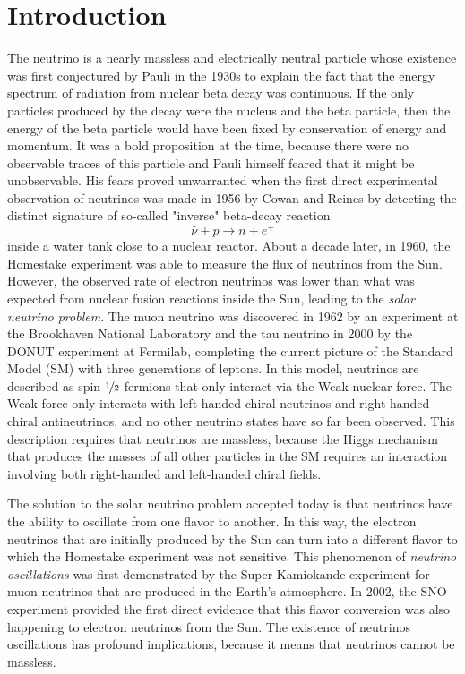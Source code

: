 \setchapterpreamble[u]{\margintoc}
\chapter{Introduction}

The neutrino is a nearly massless and electrically neutral particle whose existence was first conjectured by Pauli in the 1930s to explain the fact that the energy spectrum of radiation from nuclear beta decay was continuous.
If the only particles produced by the decay were the nucleus and the beta particle, then the energy of the beta particle would have been fixed by conservation of energy and momentum.
It was a bold proposition at the time, because there were no observable traces of this particle and Pauli himself feared that it might be unobservable.
His fears proved unwarranted when the first direct experimental observation of neutrinos was made in 1956 by Cowan and Reines\cite{cowan:1956} by detecting the distinct signature of so-called "inverse" beta-decay reaction
\begin{equation}
    \bar{\nu} + p \rightarrow n + e^+
\end{equation}
inside a water tank close to a nuclear reactor.
About a decade later, in 1960, the Homestake experiment was able to measure the flux of neutrinos from the Sun.
However, the observed rate of electron neutrinos was lower than what was expected from nuclear fusion reactions inside the Sun, leading to the \emph{solar neutrino problem}.
The muon neutrino was discovered in 1962 by an experiment at the Brookhaven National Laboratory\cite{PhysRevLett.9.36} and the tau neutrino in 2000 by the DONUT experiment at Fermilab\cite{Kodama_2001}, completing the current picture of the Standard Model (SM) with three generations of leptons.
In this model, neutrinos are described as spin-$\nicefrac{1}{2}$ fermions that only interact via the Weak nuclear force.
The Weak force only interacts with left-handed chiral neutrinos and right-handed chiral antineutrinos, and no other neutrino states have so far been observed.
This description requires that neutrinos are massless, because the Higgs mechanism that produces the masses of all other particles in the SM requires an interaction involving both right-handed and left-handed chiral fields.

The solution to the solar neutrino problem accepted today is that neutrinos have the ability to oscillate from one flavor to another.
In this way, the electron neutrinos that are initially produced by the Sun can turn into a different flavor to which the Homestake experiment was not sensitive.
This phenomenon of \emph{neutrino oscillations} was first demonstrated by the Super-Kamiokande experiment for muon neutrinos that are produced in the Earth's atmosphere\cite{PhysRevLett.81.1562}.
In 2002, the SNO experiment provided the first direct evidence that this flavor conversion was also happening to electron neutrinos from the Sun\cite{PhysRevLett.89.011301}.
The existence of neutrinos oscillations has profound implications, because it means that neutrinos cannot be massless.

